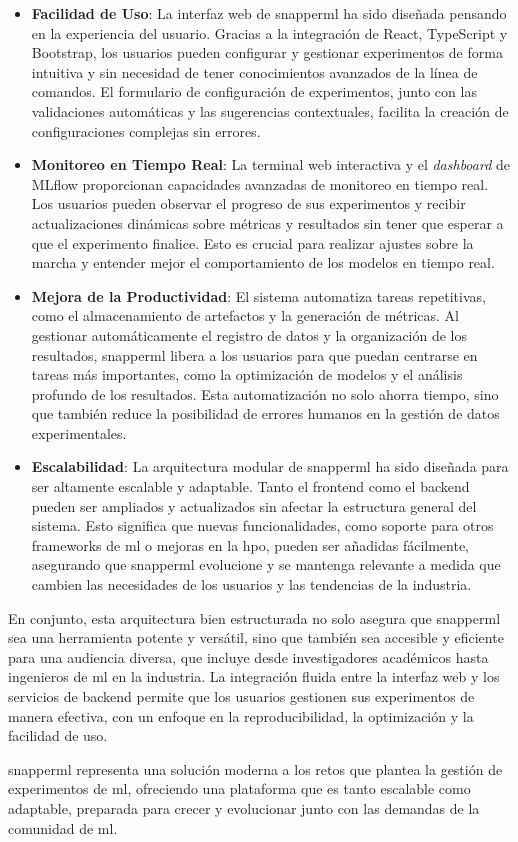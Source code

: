 \begin{itemize}
    \item \textbf{Facilidad de Uso}: La interfaz web de \Gls{snapperml} ha sido diseñada pensando en la experiencia del usuario. Gracias a la integración de React, TypeScript y Bootstrap, los usuarios pueden configurar y gestionar experimentos de forma intuitiva y sin necesidad de tener conocimientos avanzados de la línea de comandos. El formulario de configuración de experimentos, junto con las validaciones automáticas y las sugerencias contextuales, facilita la creación de configuraciones complejas sin errores.
    \item \textbf{Monitoreo en Tiempo Real}: La terminal web interactiva y el \textit{dashboard} de MLflow proporcionan capacidades avanzadas de monitoreo en tiempo real. Los usuarios pueden observar el progreso de sus experimentos y recibir actualizaciones dinámicas sobre métricas y resultados sin tener que esperar a que el experimento finalice. Esto es crucial para realizar ajustes sobre la marcha y entender mejor el comportamiento de los modelos en tiempo real.

    \item \textbf{Mejora de la Productividad}: El sistema automatiza tareas repetitivas, como el almacenamiento de \gls{artefactos} y la generación de métricas. Al gestionar automáticamente el registro de datos y la organización de los resultados, \Gls{snapperml} libera a los usuarios para que puedan centrarse en tareas más importantes, como la optimización de modelos y el análisis profundo de los resultados. Esta automatización no solo ahorra tiempo, sino que también reduce la posibilidad de errores humanos en la gestión de datos experimentales.

    \item \textbf{Escalabilidad}: La arquitectura modular de \Gls{snapperml} ha sido diseñada para ser altamente escalable y adaptable. Tanto el \gls{frontend} como el \gls{backend} pueden ser ampliados y actualizados sin afectar la estructura general del sistema. Esto significa que nuevas funcionalidades, como soporte para otros \glspl{framework} de \acrshort{ml} o mejoras en la \acrlong{hpo}, pueden ser añadidas fácilmente, asegurando que \Gls{snapperml} evolucione y se mantenga relevante a medida que cambien las necesidades de los usuarios y las tendencias de la industria.
\end{itemize}

En conjunto, esta arquitectura bien estructurada no solo asegura que \Gls{snapperml} sea una herramienta potente y versátil, sino que también sea accesible y eficiente para una audiencia diversa, que incluye desde investigadores académicos hasta ingenieros de \acrshort{ml} en la industria. La integración fluida entre la interfaz web y los servicios de \gls{backend} permite que los usuarios gestionen sus experimentos de manera efectiva, con un enfoque en la reproducibilidad, la optimización y la facilidad de uso.

\Gls{snapperml} representa una solución moderna a los retos que plantea la gestión de experimentos de \acrshort{ml}, ofreciendo una plataforma que es tanto escalable como adaptable, preparada para crecer y evolucionar junto con las demandas de la comunidad de \acrlong{ml}.